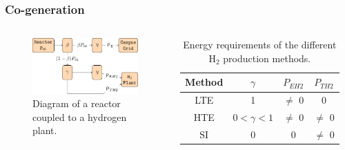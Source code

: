 \begin{frame}
\frametitle{Co-generation}
\begin{columns}
    \column[t]{5cm}
  	\begin{figure}[htbp!]
		\begin{center}
			\includegraphics[width=4.5cm]{images/hte-figure0.png}
		\end{center}
		\caption{Diagram of a reactor coupled to a hydrogen plant.}
 	\end{figure}

 	\column[t]{5cm}
	\begin{table}[!htb]
		\centering
	    \caption{Energy requirements of the different H$_2$ production methods.}
		\begin{tabular}{cccc}
	\hline
    Method    & $\gamma$         & $P_{EH2}$ & $P_{TH2}$ \\ \hline
    LTE & 1                & $\ne$ 0   & 0         \\ 
    HTE & $0 < \gamma < 1$ & $\ne$ 0   & $\ne$ 0   \\ 
    SI  & 0                & 0         & $\ne$ 0   \\ \hline
        \end{tabular}
	\end{table}
\end{columns}
\end{frame}

